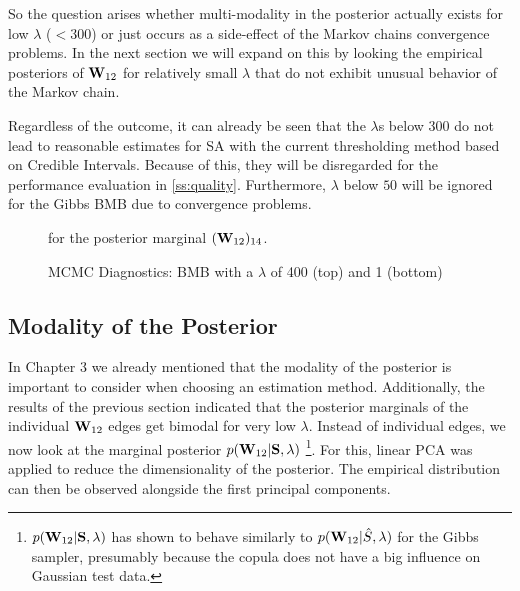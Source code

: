 So the question arises whether multi-modality in the posterior actually exists for low $\lambda$ ($<300$) or just occurs as a side-effect of the Markov chains convergence problems.
In the next section we will expand on this by looking the empirical posteriors of $\mathbf{W}_{12}$ for relatively small $\lambda$ that do not exhibit unusual behavior of the Markov chain.

Regardless of the outcome, it can already be seen that the $\lambda$s below $300$ do not lead to reasonable estimates 
for SA with the current thresholding method based on Credible Intervals.
Because of this, they will be disregarded for the performance evaluation in \autoref{ss:quality}.
Furthermore, $\lambda$ below $50$ will be ignored for the Gibbs BMB due to convergence problems.

\begin{figure}
	\centering
	
	\caption{MCMC Diagnostics: BMB with a $\lambda$ of 400 (top) and 1 (bottom)}
	for the posterior marginal $(\mathbf{W}_{12})_{14}$.
	\label{fig:diag_GIBBS_l1_400}
\end{figure}

\FloatBarrier
\subsection{Modality of the Posterior}
\label{ss:modality}
In Chapter 3 we already mentioned that the modality of the posterior is important to consider when choosing an estimation method.
Additionally, the results of the previous section indicated that the posterior marginals of the individual $\mathbf{W}_{12}$ edges get bimodal for very low $\lambda$. 
Instead of individual edges, we now look at the marginal posterior $ p(\mathbf{W}_{12}|\mathbf{S}, \lambda)$ \footnote{$p(\mathbf{W}_{12} | \mathbf{S}, \lambda)$ has shown to behave similarly to $p(\mathbf{W}_{12} | \hat{S}, \lambda)$ for the Gibbs sampler, presumably because the copula does not have a big influence on Gaussian test data.}.
For this, linear \gls{PCA} was applied to reduce the dimensionality of the posterior.
The empirical distribution can then be observed alongside the first principal components.

